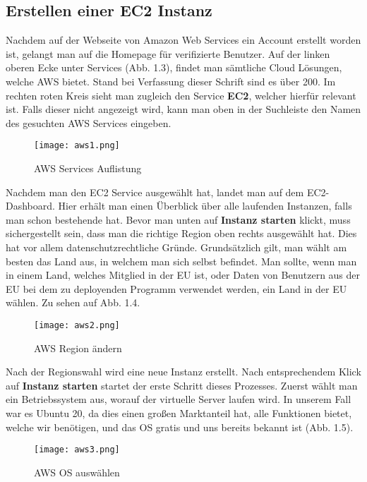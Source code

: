 \subsection{Erstellen einer EC2 Instanz}
Nachdem auf der Webseite von Amazon Web Services ein Account erstellt worden ist, gelangt man auf die Homepage für verifizierte Benutzer.
Auf der linken oberen Ecke unter Services (Abb. 1.3), findet man sämtliche Cloud Lösungen, welche AWS bietet.
Stand bei Verfassung dieser Schrift sind es über 200. Im rechten roten Kreis sieht man zugleich den Service \textbf{EC2}, welcher hierfür relevant ist.
Falls dieser nicht angezeigt wird, kann man oben in der Suchleiste den Namen des gesuchten AWS Services eingeben.
\begin{center}
\begin{figure}[H]
    \centering
    \texttt{[image: aws1.png]}
    \caption{AWS Services Auflistung}
\end{figure}
\end{center}
Nachdem man den EC2 Service ausgewählt hat, landet man auf dem EC2-Dashboard. Hier erhält man einen Überblick über alle laufenden Instanzen, falls man schon bestehende hat.
Bevor man unten auf \textbf{Instanz starten} klickt, muss sichergestellt sein, dass man die richtige Region oben rechts ausgewählt hat. Dies hat vor allem datenschutzrechtliche Gründe.
Grundsätzlich gilt, man wählt am besten das Land aus, in welchem man sich selbst befindet.
Man sollte, wenn man in einem Land, welches Mitglied in der EU ist, oder Daten von Benutzern aus der EU bei dem zu deployenden Programm verwendet werden, ein Land in der EU wählen. Zu sehen auf Abb. 1.4.
\begin{center}
\begin{figure}[H]
    \centering
    \texttt{[image: aws2.png]}
    \caption{AWS Region ändern}
\end{figure}
\end{center}
Nach der Regionswahl wird eine neue Instanz erstellt. Nach entsprechendem Klick auf \textbf{Instanz starten} startet der erste Schritt dieses Prozesses.
Zuerst wählt man ein Betriebssystem aus, worauf der virtuelle Server laufen wird.
In unserem Fall war es Ubuntu 20, da dies einen großen Marktanteil hat, alle Funktionen bietet, welche wir benötigen, und das OS gratis und uns bereits bekannt ist (Abb. 1.5).
\begin{center}
\begin{figure}[H]
    \centering
    \texttt{[image: aws3.png]}
    \caption{AWS OS auswählen}
\end{figure}
\end{center}
